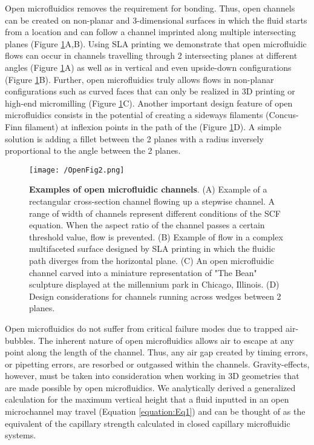 Open microfluidics removes the requirement for bonding. Thus, open channels can be created on non-planar and 3-dimensional surfaces in which the fluid starts from a location and can follow a channel imprinted along multiple intersecting planes (Figure \ref{figure:Fig2}A,B). Using SLA printing we demonstrate that open microfluidic flows can occur in channels travelling through 2 intersecting planes at different angles (Figure \ref{figure:Fig2}A) as well as in vertical and even upside-down configurations (Figure \ref{figure:Fig2}B). Further, open microfluidics truly allows flows in non-planar configurations such as curved faces that can only be realized in 3D printing or high-end micromilling (Figure \ref{figure:Fig2}C). Another important design feature of open microfluidics consists in the potential of creating a sideways filaments (Concus-Finn filament) at inflexion points in the path of the (Figure \ref{figure:Fig2}D). A simple solution is adding a fillet between the 2 planes with a radius inversely proportional to the angle between the 2 planes.

\begin{figure}[h!] %
\centering
\texttt{[image: /OpenFig2.png]}
\caption[\textbf{Examples of open microfluidic channels}]{\textbf{Examples of open microfluidic channels}. (A) Example of a rectangular cross-section channel flowing up a stepwise channel. A range of width of channels represent different conditions of the SCF equation. When the aspect ratio of the channel passes a certain threshold value, flow is prevented. (B) Example of flow in a complex multifaceted surface designed by SLA printing in which the fluidic path diverges from the horizontal plane. (C) An open microfluidic channel carved into a miniature representation of "The Bean" sculpture displayed at the millennium park in Chicago, Illinois. (D) Design considerations for channels running across wedges between 2 planes.}
\label{figure:Fig2}
\end{figure}

Open microfluidics do not suffer from critical failure modes due to trapped air-bubbles. The inherent nature of open microfluidics allows air to escape at any point along the length of the channel. Thus, any air gap created by timing errors, or pipetting errors, are resorbed or outgassed within the channels. Gravity-effects, however, must be taken into consideration when working in 3D geometries that are made possible by open microfluidics. We analytically derived a generalized calculation for the maximum vertical height that a fluid inputted in an open microchannel may travel (Equation \ref{equation:Eq1}) and can be thought of as the equivalent of the capillary strength calculated in closed capillary microfluidic systems. 

